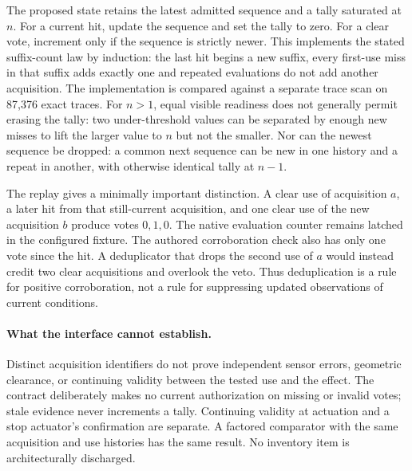 \documentclass[11pt]{article}
\begin{document}
The proposed state retains the latest admitted sequence and a tally
saturated at $n$. For a current hit, update the sequence and set the
tally to zero. For a clear vote, increment only if the sequence is
strictly newer. This implements the stated suffix-count law by
induction: the last hit begins a new suffix, every first-use miss in
that suffix adds exactly one and repeated evaluations do not add
another acquisition. The implementation is compared against a
separate trace scan on 87{,}376 exact traces. For $n>1$, equal visible
readiness does not generally permit erasing the tally: two under-threshold
values can be separated by enough new misses to lift the larger value
to $n$ but not the smaller. Nor can the newest sequence be dropped:
a common next sequence can be new in one history and a repeat in
another, with otherwise identical tally at $n-1$.

The replay gives a minimally important distinction. A clear use of
acquisition $a$, a later hit from that still-current acquisition,
and one clear use of the new acquisition $b$ produce votes $0,1,0$.
The native evaluation counter remains latched in the configured
fixture. The authored corroboration check also has only one vote
since the hit. A deduplicator that drops the second use of $a$
would instead credit two clear acquisitions and overlook the veto.
Thus deduplication is a rule for positive corroboration, not a rule
for suppressing updated observations of current conditions.

\paragraph{What the interface cannot establish.}
Distinct acquisition identifiers do not prove independent sensor
errors, geometric clearance, or continuing validity between the
tested use and the effect. The contract deliberately makes no
current authorization on missing or invalid votes; stale evidence
never increments a tally. Continuing validity at actuation and
a stop actuator's confirmation are separate. A factored comparator
with the same acquisition and use histories has the same result.
No inventory item is architecturally discharged.
\end{document}
